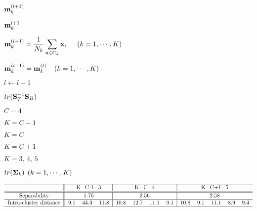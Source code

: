 \documentclass{article}
\def\lthtmlcheckvsize{\ifdim\ht\sizebox<\vsize 
  \ifdim\wd\sizebox<\hsize\expandafter\hfill\fi \expandafter\vfill
  \else\expandafter\vss\fi}%
\begin{document}
{\newpage\clearpage
{}%
$ {\bf m}_k^{(l+1)}$%
\lthtmlindisplaymathZ
\lthtmlcheckvsize\clearpage}

{\newpage\clearpage
{}%
$ {\bf m}_k^{l+1}$%
\lthtmlindisplaymathZ
\lthtmlcheckvsize\clearpage}

{\newpage\clearpage
{}%
$\displaystyle {\bf m}_k^{(l+1)}=\frac{1}{N_k} \sum_{{\bf x} \in C_k} {\bf x},\;\;\;\;\;
(k=1,\cdots,K)$%
\lthtmlindisplaymathZ
\lthtmlcheckvsize\clearpage}

{\newpage\clearpage
{}%
$\displaystyle {\bf m}_k^{(l+1)}={\bf m}_k^{(l)}\;\;\;\;(k=1,\cdots,K)$%
\lthtmlindisplaymathZ
\lthtmlcheckvsize\clearpage}

{\newpage\clearpage
{}%
$ l \leftarrow l+1 $%
\lthtmlindisplaymathZ
\lthtmlcheckvsize\clearpage}

{\newpage\clearpage
{}%
$ tr({\bf S}_T^{-1}{\bf S}_B)$%
\lthtmlindisplaymathZ
\lthtmlcheckvsize\clearpage}

{\newpage\clearpage
{}%
$ C=4$%
\lthtmlindisplaymathZ
\lthtmlcheckvsize\clearpage}

{\newpage\clearpage
{}%
$ K=C-1$%
\lthtmlindisplaymathZ
\lthtmlcheckvsize\clearpage}

{\newpage\clearpage
{}%
$ K=C$%
\lthtmlindisplaymathZ
\lthtmlcheckvsize\clearpage}

{\newpage\clearpage
{}%
$ K=C+1$%
\lthtmlindisplaymathZ
\lthtmlcheckvsize\clearpage}

{\newpage\clearpage
{}%
$ K=3,\,4,\,5$%
\lthtmlindisplaymathZ
\lthtmlcheckvsize\clearpage}

{\newpage\clearpage
{}%
$ tr({\bf\Sigma}_k)\,\;(k=1,\cdots,K)$%
\lthtmlindisplaymathZ
\lthtmlcheckvsize\clearpage}

{\newpage\clearpage
{}%
$\displaystyle \begin{tabular}{c||ccc|cccc|ccccc}\hline
&\multicolumn{3}{c}{K=C-1=3} & \multicolumn{4}{|c|}{K=C=4} &
\multicolumn{5}{c}{K=C+1=5} \\\hline\hline
\mbox{Separability} & \multicolumn{3}{c}{1.76}&\multicolumn{4}{|c|}{2.56}
& \multicolumn{5}{c}{2.58}\\\hline
\mbox{Intra-cluster distance}
& 9.1 & 44.3 & 11.8&10.8&12.7&11.1&9.1&10.8&9.1&11.1&8.9&9.4\\\hline
\end{tabular}$%
\lthtmlindisplaymathZ
\lthtmlcheckvsize\clearpage}
\end{document}
